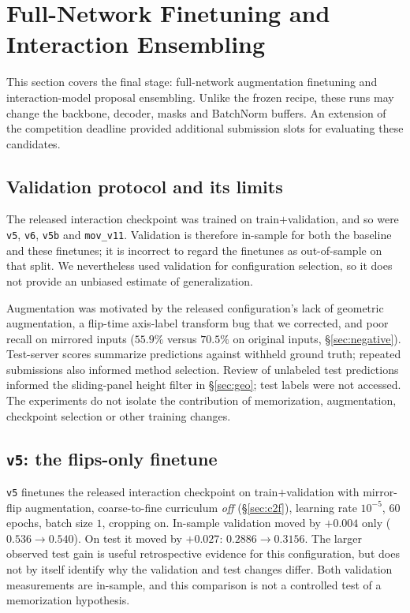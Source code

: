 \documentclass[11pt]{article}
\begin{document}
\section{Full-Network Finetuning and Interaction Ensembling}
\label{sec:extension}

This section covers the final stage: full-network augmentation finetuning
and interaction-model proposal ensembling. Unlike the frozen recipe,
these runs may change the backbone, decoder, masks and BatchNorm buffers.
An extension of the competition deadline provided additional submission
slots for evaluating these candidates.

\subsection{Validation protocol and its limits}

The released interaction checkpoint was trained on train$+$validation,
and so were \texttt{v5}, \texttt{v6}, \texttt{v5b} and \texttt{mov\_v11}.
Validation is therefore in-sample for both the baseline and these
finetunes; it is incorrect to regard the finetunes as out-of-sample on
that split. We nevertheless used validation for configuration selection,
so it does not provide an unbiased estimate of generalization.

Augmentation was motivated by the released configuration's lack of geometric
augmentation, a flip-time axis-label transform bug that we corrected, and
poor recall on mirrored inputs ($55.9\%$ versus $70.5\%$ on original inputs,
\S\ref{sec:negative}). Test-server scores summarize predictions against
withheld ground truth; repeated submissions also informed method selection.
Review of unlabeled test predictions informed the sliding-panel height
filter in \S\ref{sec:geo}; test labels were not accessed.
The experiments do not isolate the contribution of memorization,
augmentation, checkpoint selection or other training changes.

\subsection{\texttt{v5}: the flips-only finetune}

\texttt{v5} finetunes the released interaction checkpoint on
train$+$validation with mirror-flip augmentation, coarse-to-fine curriculum
\emph{off} (\S\ref{sec:c2f}), learning rate $10^{-5}$, $60$ epochs, batch
size $1$, cropping on. In-sample validation moved by $+0.004$ only
($0.536 \to 0.540$). On test it moved by $+0.027$:
$0.2886 \to \mathbf{0.3156}$. The larger observed test gain is useful retrospective evidence for this
configuration, but does not by itself identify why the validation and test
changes differ. Both validation measurements are in-sample, and this
comparison is not a controlled test of a memorization hypothesis.
\end{document}
